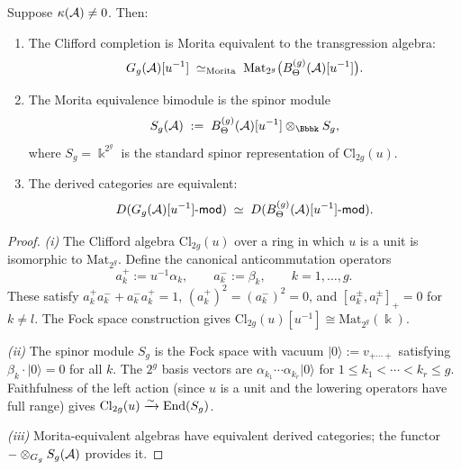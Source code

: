 \begin{theorem}
\label{thm:topological-regime}
Suppose $\kappa(\mathcal{A}) \neq 0$. Then:
\begin{enumerate}[label=\textup{(\roman*)}]
\item The Clifford completion is Morita equivalent to the
transgression algebra:
\begin{equation}\label{eq:g9-topo-morita}
G_g(\mathcal{A})[u^{-1}]
\;\simeq_{\mathrm{Morita}}\;
\mathrm{Mat}_{2^g}\bigl(B_\Theta^{(g)}(\mathcal{A})[u^{-1}]\bigr).
\end{equation}

\item The Morita equivalence bimodule is the spinor module
\begin{equation}\label{eq:g9-spinor-bimod}
S_g(\cA)
\;:=\;
B_\Theta^{(g)}(\cA)[u^{-1}] \otimes_\Bbbk S_g,
\end{equation}
where $S_g = \Bbbk^{2^g}$ is the standard spinor representation of
$\mathrm{Cl}_{2g}(u)$.

\item The derived categories are equivalent:
\begin{equation}\label{eq:g9-topo-derived}
D(G_g(\mathcal{A})[u^{-1}]\text{-}\mathsf{mod})
\;\simeq\;
D(B_\Theta^{(g)}(\mathcal{A})[u^{-1}]\text{-}\mathsf{mod}).
\end{equation}
\end{enumerate}
\end{theorem}

\begin{proof}
\emph{(i)} The Clifford algebra $\mathrm{Cl}_{2g}(u)$ over a ring in
which $u$ is a unit is isomorphic to $\mathrm{Mat}_{2^g}$. Define the
canonical anticommutation operators
\begin{equation}\label{eq:g9-raising-lowering}
a_k^+ := u^{-1}\alpha_k,
\qquad
a_k^- := \beta_k,
\qquad k = 1, \ldots, g.
\end{equation}
These satisfy $a_k^+ a_k^- + a_k^- a_k^+ = 1$,
$(a_k^+)^2 = (a_k^-)^2 = 0$, and $[a_k^\pm, a_l^\pm]_+ = 0$ for
$k \neq l$. The Fock space construction gives
$\mathrm{Cl}_{2g}(u)[u^{-1}] \cong \mathrm{Mat}_{2^g}(\Bbbk)$.

\emph{(ii)} The spinor module $S_g$ is the Fock space with vacuum
$|0\rangle := v_{+\cdots+}$ satisfying $\beta_k \cdot |0\rangle = 0$
for all $k$. The $2^g$ basis vectors are
$\alpha_{k_1}\cdots\alpha_{k_r}|0\rangle$ for
$1 \leq k_1 < \cdots < k_r \leq g$. Faithfulness of the left action
(since $u$ is a unit and the lowering operators have full range) gives
$\mathrm{Cl}_{2g}(u) \xrightarrow{\sim} \operatorname{End}(S_g)$.

\emph{(iii)} Morita-equivalent algebras have equivalent derived
categories; the functor $- \otimes_{G_g} S_g(\mathcal{A})$ provides it.
\end{proof}

